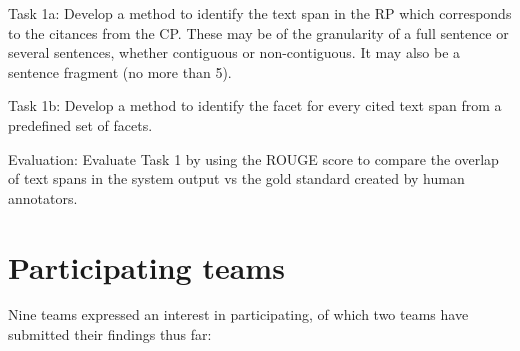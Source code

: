 \documentclass[11pt]{article}
\begin{document}
Task 1a: Develop a method to identify the text span in the RP which corresponds to the citances from the CP. These may be of the granularity of a full sentence or several sentences, whether contiguous or non-contiguous. It may also be a sentence fragment (no more than 5).

Task 1b: Develop a method to identify the facet for every cited text span from a predefined set of facets.

Evaluation: Evaluate Task 1 by using the ROUGE score to compare the overlap of text spans in the system output vs the gold standard created by human annotators.

\section{Participating teams}
Nine teams expressed an interest in participating, of which two teams have submitted their findings thus far:
\end{document}
